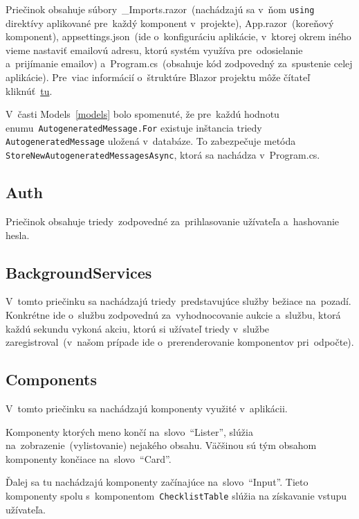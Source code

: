 Priečinok obsahuje súbory~\_Imports.razor~(nachádzajú sa v~ňom \verb|using| direktívy aplikované pre~každý komponent v~projekte), App.razor~(koreňový komponent), appsettings.json~(ide o~konfiguráciu aplikácie, v~ktorej okrem iného vieme nastaviť emailovú adresu, ktorú systém využíva pre~odosielanie a~prijímanie emailov) a~Program.cs~(obsahuje kód zodpovedný za~spustenie celej aplikácie). Pre~viac informácií o~štruktúre Blazor projektu môže čítateľ kliknúť~\href{https://learn.microsoft.com/en-us/aspnet/core/blazor/project-structure?view=aspnetcore-7.0}{tu}.

V~časti Models~\ref{models} bolo spomenuté, že pre~každú hodnotu\\enumu~\verb|AutogeneratedMessage.For| existuje inštancia triedy\\\verb|AutogeneratedMessage| uložená v~databáze. To zabezpečuje metóda\\\verb|StoreNewAutogeneratedMessagesAsync|, ktorá sa nachádza v~Program.cs.

\subsection{Auth}

Priečinok obsahuje triedy~zodpovedné za~prihlasovanie užívateľa a~hashovanie hesla.

\subsection{BackgroundServices}

V~tomto priečinku sa nachádzajú triedy~predstavujúce služby bežiace na~pozadí. Konkrétne ide o~službu zodpovednú za~vyhodnocovanie aukcie a~službu, ktorá každú sekundu vykoná akciu, ktorú si užívateľ triedy v~službe zaregistroval~(v~našom prípade ide o~prerenderovanie komponentov pri~odpočte).

\subsection{Components}

V~tomto priečinku sa nachádzajú komponenty využité v~aplikácii.

Komponenty ktorých meno končí na~slovo~``Lister'', slúžia na~zobrazenie~(vylistovanie) nejakého obsahu. Väčšinou sú tým obsahom komponenty končiace na~slovo~``Card''.

Ďalej sa tu nachádzajú komponenty začínajúce na~slovo~``Input''. Tieto komponenty spolu s~komponentom~\verb|ChecklistTable| slúžia na získavanie vstupu užívateľa.

